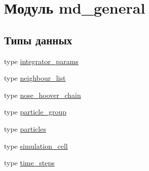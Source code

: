 \hypertarget{namespacemd__general}{}\section{Модуль md\+\_\+general}
\label{namespacemd__general}
\subsection*{Типы данных}
\begin{DoxyCompactItemize}
\item 
type \mbox{\hyperlink{structmd__general_1_1integrator__params}{integrator\+\_\+params}}
\item 
type \mbox{\hyperlink{structmd__general_1_1neighbour__list}{neighbour\+\_\+list}}
\item 
type \mbox{\hyperlink{structmd__general_1_1nose__hoover__chain}{nose\+\_\+hoover\+\_\+chain}}
\item 
type \mbox{\hyperlink{structmd__general_1_1particle__group}{particle\+\_\+group}}
\item 
type \mbox{\hyperlink{structmd__general_1_1particles}{particles}}
\item 
type \mbox{\hyperlink{structmd__general_1_1simulation__cell}{simulation\+\_\+cell}}
\item 
type \mbox{\hyperlink{structmd__general_1_1time__steps}{time\+\_\+steps}}
\end{DoxyCompactItemize}
